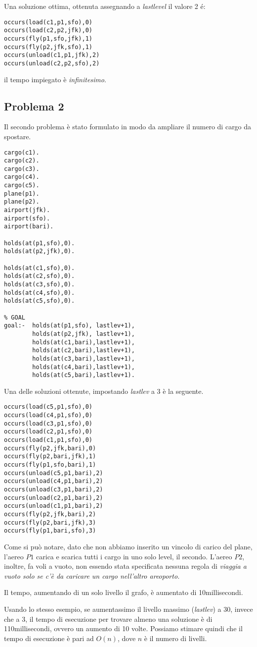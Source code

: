 Una soluzione ottima, ottenuta assegnando a \emph{lastlevel} il valore 2 é:

\begin{lstlisting}
occurs(load(c1,p1,sfo),0)
occurs(load(c2,p2,jfk),0)
occurs(fly(p1,sfo,jfk),1)
occurs(fly(p2,jfk,sfo),1)
occurs(unload(c1,p1,jfk),2)
occurs(unload(c2,p2,sfo),2)
\end{lstlisting}

il tempo impiegato è \emph{infinitesimo}.

\subsection{Problema 2}

Il secondo problema è stato formulato in modo da ampliare il numero di cargo da spostare.

\begin{lstlisting}
cargo(c1).
cargo(c2).
cargo(c3).
cargo(c4).
cargo(c5).
plane(p1).
plane(p2).
airport(jfk).
airport(sfo).
airport(bari).

holds(at(p1,sfo),0).
holds(at(p2,jfk),0).

holds(at(c1,sfo),0).
holds(at(c2,sfo),0).
holds(at(c3,sfo),0).
holds(at(c4,sfo),0).
holds(at(c5,sfo),0).

% GOAL
goal:-  holds(at(p1,sfo), lastlev+1),
        holds(at(p2,jfk), lastlev+1),
        holds(at(c1,bari),lastlev+1),
        holds(at(c2,bari),lastlev+1),
        holds(at(c3,bari),lastlev+1),
        holds(at(c4,bari),lastlev+1),
        holds(at(c5,bari),lastlev+1).
\end{lstlisting}

Una delle soluzioni ottenute, impostando \emph{lastlev} a 3 è la seguente.

\begin{lstlisting}
occurs(load(c5,p1,sfo),0)
occurs(load(c4,p1,sfo),0)
occurs(load(c3,p1,sfo),0)
occurs(load(c2,p1,sfo),0)
occurs(load(c1,p1,sfo),0)
occurs(fly(p2,jfk,bari),0)
occurs(fly(p2,bari,jfk),1)
occurs(fly(p1,sfo,bari),1)
occurs(unload(c5,p1,bari),2)
occurs(unload(c4,p1,bari),2)
occurs(unload(c3,p1,bari),2)
occurs(unload(c2,p1,bari),2)
occurs(unload(c1,p1,bari),2)
occurs(fly(p2,jfk,bari),2)
occurs(fly(p2,bari,jfk),3)
occurs(fly(p1,bari,sfo),3)
\end{lstlisting}

Come si può notare, dato che non abbiamo inserito un vincolo di carico del plane, l'aereo $P1$ carica e scarica tutti i cargo in uno solo level, il secondo. L'aereo $P2$, inoltre, fa voli a vuoto, non essendo stata specificata nessuna regola di \emph{viaggia a vuoto solo se c'è da caricare un cargo nell'altro areoporto.}

Il tempo, aumentando di un solo livello il grafo, è aumentato di 10millisecondi.

Usando lo stesso esempio, se aumentassimo il livello massimo (\emph{lastlev}) a 30, invece che a 3, il tempo di esecuzione per trovare almeno una soluzione è di 110millisecondi, ovvero un aumento di 10 volte. Possiamo stimare quindi che il tempo di esecuzione è pari ad $O(n)$, dove $n$ è il numero di livelli.
